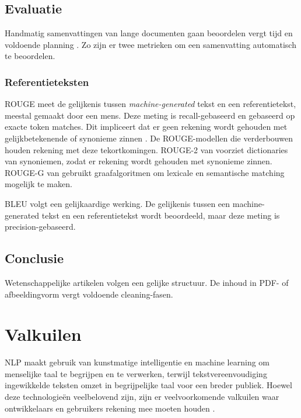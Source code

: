 \subsection{Evaluatie}


Handmatig samenvattingen van lange documenten gaan beoordelen vergt tijd en voldoende planning \autocite{Nenkova2004}. Zo zijn er twee metrieken om een samenvatting automatisch te beoordelen.


\subsubsection{Referentieteksten}

ROUGE meet de gelijkenis tussen \textit{machine-generated} tekst en een referentietekst, meestal gemaakt door een mens. Deze meting is recall-gebaseerd en gebaseerd op exacte token matches. Dit impliceert dat er geen rekening wordt gehouden met gelijkbetekenende of synonieme zinnen \autocite{Lin2004}. De ROUGE-modellen die verderbouwen houden rekening met deze tekortkomingen. ROUGE-2 van \textcite{Ganesan2018} voorziet dictionaries van synoniemen, zodat er rekening wordt gehouden met synonieme zinnen. ROUGE-G van \textcite{ShafieiBavani2018} gebruikt graafalgoritmen om lexicale en semantische matching mogelijk te maken.

BLEU volgt een gelijkaardige werking. De gelijkenis tussen een machine-generated tekst en een referentietekst wordt beoordeeld, maar deze meting is precision-gebaseerd.




\subsection{Conclusie}

Wetenschappelijke artikelen volgen een gelijke structuur. De inhoud in PDF- of afbeeldingvorm vergt voldoende cleaning-fasen. 


\section{Valkuilen}

NLP maakt gebruik van kunstmatige intelligentie en machine learning om menselijke taal te begrijpen en te verwerken, terwijl tekstvereenvoudiging ingewikkelde teksten omzet in begrijpelijke taal voor een breder publiek. Hoewel deze technologieën veelbelovend zijn, zijn er veelvoorkomende valkuilen waar ontwikkelaars en gebruikers rekening mee moeten houden \autocite{Sciforce2020, Roldos2020, Khurana2022}.

